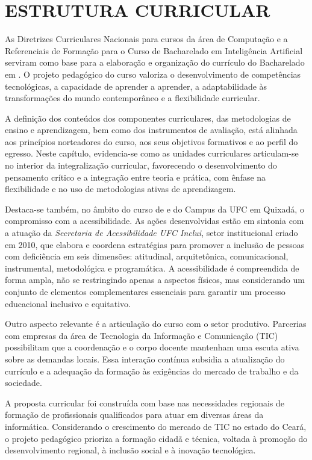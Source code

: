 \chapter{ESTRUTURA CURRICULAR}
\label{cap:estrutura-curricular}

As Diretrizes Curriculares Nacionais para cursos da área de Computação \cite{cne2001parecer9} e a Referenciais de Formação para o Curso de Bacharelado em Inteligência Artificial \cite{sbc2024} serviram como base para a elaboração e organização do currículo do Bacharelado em \nomedocurso. O projeto pedagógico do curso valoriza o desenvolvimento de competências tecnológicas, a capacidade de aprender a aprender, a adaptabilidade às transformações do mundo contemporâneo e a flexibilidade curricular.

A definição dos conteúdos dos componentes curriculares, das metodologias de ensino e aprendizagem, bem como dos instrumentos de avaliação, está alinhada aos princípios norteadores do curso, aos seus objetivos formativos e ao perfil do egresso. Neste capítulo, evidencia-se como as unidades curriculares articulam-se no interior da integralização curricular, favorecendo o desenvolvimento do pensamento crítico e a integração entre teoria e prática, com ênfase na flexibilidade e no uso de metodologias ativas de aprendizagem.

Destaca-se também, no âmbito do curso de \nomedocurso e do Campus da UFC em Quixadá, o compromisso com a acessibilidade. As ações desenvolvidas estão em sintonia com a atuação da \textit{Secretaria de Acessibilidade UFC Inclui}, setor institucional criado em 2010, que elabora e coordena estratégias para promover a inclusão de pessoas com deficiência em seis dimensões: atitudinal, arquitetônica, comunicacional, instrumental, metodológica e programática. A acessibilidade é compreendida de forma ampla, não se restringindo apenas a aspectos físicos, mas considerando um conjunto de elementos complementares essenciais para garantir um processo educacional inclusivo e equitativo.

Outro aspecto relevante é a articulação do curso com o setor produtivo. Parcerias com empresas da área de Tecnologia da Informação e Comunicação (TIC) possibilitam que a coordenação e o corpo docente mantenham uma escuta ativa sobre as demandas locais. Essa interação contínua subsidia a atualização do currículo e a adequação da formação às exigências do mercado de trabalho e da sociedade.

A proposta curricular foi construída com base nas necessidades regionais de formação de profissionais qualificados para atuar em diversas áreas da informática. Considerando o crescimento do mercado de TIC no estado do Ceará, o projeto pedagógico prioriza a formação cidadã e técnica, voltada à promoção do desenvolvimento regional, à inclusão social e à inovação tecnológica.


